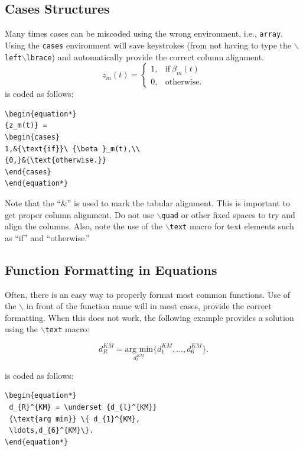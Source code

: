 \documentclass[]{IEEEtran}
\begin{document}
\subsection{Cases Structures}
Many times cases can be miscoded using the wrong environment, i.e., {\tt{array}}. Using the {\tt{cases}} environment will save keystrokes (from not having to type the $\backslash${\tt{left}}$\backslash${\tt{lbrace}}) and automatically provide the correct column alignment.
\begin{equation*}
	{z_m(t)} = \begin{cases}
		1,   & {\text{if}}\ {\beta }_m(t) \\
		{0,} & {\text{otherwise.}}
	\end{cases}
\end{equation*}
\noindent is coded as follows:
\begin{verbatim}
\begin{equation*}
{z_m(t)} = 
\begin{cases}
1,&{\text{if}}\ {\beta }_m(t),\\ 
{0,}&{\text{otherwise.}} 
\end{cases}
\end{equation*}
\end{verbatim}
\noindent Note that the ``\&'' is used to mark the tabular alignment. This is important to get  proper column alignment. Do not use $\backslash${\tt{quad}} or other fixed spaces to try and align the columns. Also, note the use of the $\backslash${\tt{text}} macro for text elements such as ``if'' and ``otherwise.''

\subsection{Function Formatting in Equations}
Often, there is an easy way to properly format most common functions. Use of the $\backslash$ in front of the function name will in most cases, provide the correct formatting. When this does not work, the following example provides a solution using the $\backslash${\tt{text}} macro:

\begin{equation*}
	d_{R}^{KM} = \underset {d_{l}^{KM}} {\text{arg min}} \{ d_{1}^{KM},\ldots,d_{6}^{KM}\}.
\end{equation*}

\noindent is coded as follows:
\begin{verbatim}
\begin{equation*} 
 d_{R}^{KM} = \underset {d_{l}^{KM}} 
 {\text{arg min}} \{ d_{1}^{KM},
 \ldots,d_{6}^{KM}\}.
\end{equation*}
\end{verbatim}
\end{document}
